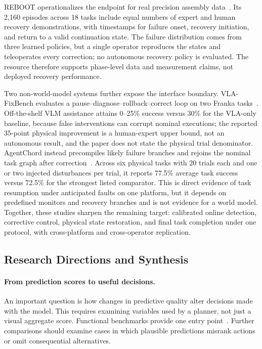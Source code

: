 REBOOT operationalizes the endpoint for real precision assembly data~\cite{oforiampofo2026reboot}. Its 2,160 episodes across 18 tasks include equal numbers of expert and human recovery demonstrations, with timestamps for failure onset, recovery initiation, and return to a valid continuation state. The failure distribution comes from three learned policies, but a single operator reproduces the states and teleoperates every correction; no autonomous recovery policy is evaluated. The resource therefore supports phase-level data and measurement claims, not deployed recovery performance.

Two non-world-model systems further expose the interface boundary. VLA-FixBench evaluates a pause--diagnose--rollback--correct loop on two Franka tasks~\cite{yan2026vlafixbench}. Off-the-shelf VLM assistance attains 0--25\% success versus 30\% for the VLA-only baseline, because false interventions can corrupt nominal executions; the reported 35-point physical improvement is a human-expert upper bound, not an autonomous result, and the paper does not state the physical trial denominator. AgentChord instead precompiles likely failure branches and rejoins the nominal task graph after correction~\cite{xu2026agentchord}. Across six physical tasks with 20 trials each and one or two injected disturbances per trial, it reports 77.5\% average task success versus 72.5\% for the strongest listed comparator. This is direct evidence of task resumption under anticipated faults on one platform, but it depends on predefined monitors and recovery branches and is not evidence for a world model. Together, these studies sharpen the remaining target: calibrated online detection, corrective control, physical state restoration, and final task completion under one protocol, with cross-platform and cross-operator replication.

\subsection{Research Directions and Synthesis}
\paragraph{From prediction scores to useful decisions.}
An important question is how changes in predictive quality alter decisions made with the model. This requires examining variables used by a planner, not just a visual aggregate score. Functional benchmarks provide one entry point~\cite{shang2026worldarena}. Further comparisons should examine cases in which plausible predictions misrank actions or omit consequential alternatives.


